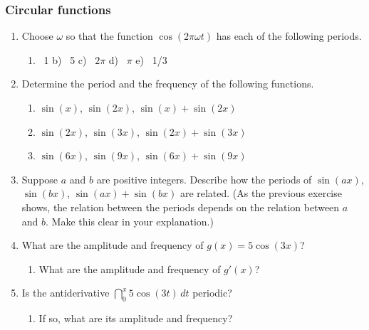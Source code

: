 \subsubsection{Circular functions}
\label{subsubsec:circular-functions}




\begin{enumerate}
\item Choose $\omega$ so that the function $\cos(2 \pi \omega t)$ has
each of the following periods.

  \begin{enumerate}
  \item \ 1 \hfill   b) \ 5 \hfill   c) \ $2\pi$ \hfill   d) \ $\pi$ \hfill
	e) \ 1/3 \hfill   \mbox{}



\end{enumerate}
\item Determine the period and the frequency of the following functions.

  \begin{enumerate}
  \item $\sin(x)$, $\sin(2x)$, $\sin(x) + \sin(2x)$


  \item $\sin(2x)$, $\sin(3x)$, $\sin(2x) + \sin(3x)$


  \item $\sin(6x)$, $\sin(9x)$, $\sin(6x) + \sin(9x)$


\end{enumerate}
\item Suppose $a$ and $b$ are positive integers.  Describe how the
periods of $\sin(ax)$, $\sin(bx)$, $\sin(ax) + \sin(bx)$ are related.
(As the previous exercise shows, the relation between the periods
depends on the relation between $a$ and $b$.  Make this clear in your
explanation.)


\item What are the amplitude and frequency of $g(x) = 5 \cos(3x)$?

  \begin{enumerate}
  \item What are the amplitude and frequency of $g'(x)$?


\end{enumerate}
\item Is the antiderivative $\dint_0^x 5 \cos(3t) \, dt$ periodic?

  \begin{enumerate}
  \item If so, what are its amplitude and frequency?



\end{enumerate}
\end{enumerate}
